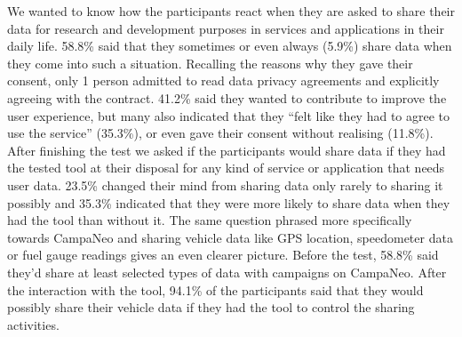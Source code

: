 \documentclass[../paper.tex]{subfiles}
\begin{document}
  We wanted to know how the participants react when they are asked to share their data for research and development purposes in services and applications in their daily life.
  58.8\% said that they sometimes or even always (5.9\%) share data when they come into such a situation.
  Recalling the reasons why they gave their consent, only 1 person admitted to read data privacy agreements and explicitly agreeing with the contract.
  41.2\% said they wanted to contribute to improve the user experience, but many also indicated that they ``felt like they had to agree to use the service'' (35.3\%), or even gave their consent without realising (11.8\%).
  After finishing the test we asked if the participants would share data if they had the tested tool at their disposal for any kind of service or application that needs user data.
  23.5\% changed their mind from sharing data only rarely to sharing it possibly and 35.3\% indicated that they were more likely to share data when they had the tool than without it.
  The same question phrased more specifically towards CampaNeo and sharing vehicle data like GPS location, speedometer data or fuel gauge readings gives an even clearer picture.
  Before the test, 58.8\% said they'd share at least selected types of data with campaigns on CampaNeo. After the interaction with the tool, 94.1\% of the participants said that they would possibly share their vehicle data if they had the tool to control the sharing activities. 
\end{document}
